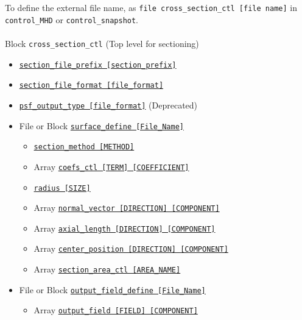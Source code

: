 To define the external file name, as \verb|file cross_section_ctl [file name]| in \verb|control_MHD| or \verb|control_snapshot|. \\
\\
%
Block \verb|cross_section_ctl| (Top level for sectioning)
\label{href_i:cross_section_ctl}
\begin{itemize}
	\item \hyperref[href_t:section_file_prefix]
			{\tt section\_file\_prefix    [section\_prefix]}
	\item \hyperref[href_t:section_file_format]
			{\tt section\_file\_format        [file\_format]}
    \item \hyperref[href_t:psf_output_type]
            {\tt psf\_output\_type        [file\_format]}         {\color{red}(Deprecated)}
	\item File or Block \hyperref[href_t:surface_define]{\tt surface\_define    [File\_Name]}
		\begin{itemize}
			\item \hyperref[href_t:section_method]
				{\tt section\_method    [METHOD]}
			\item Array \hyperref[href_t:psf_coefs_ctl]
				{\tt coefs\_ctl        [TERM]         [COEFFICIENT]}
			\item \hyperref[href_t:psf_radius]{\tt radius    [SIZE]}
			\item Array \hyperref[href_t:psf_normal_vector]
				{\tt normal\_vector    [DIRECTION]    [COMPONENT]}
			\item Array \hyperref[href_t:psf_axial_length]
                {\tt axial\_length     [DIRECTION]    [COMPONENT]}
			\item Array \hyperref[href_t:psf_center_position]
                {\tt center\_position  [DIRECTION]    [COMPONENT]}
%
			\item Array \hyperref[href_t:section_area_ctl]
				{\tt section\_area\_ctl        [AREA\_NAME]}
	\end{itemize}
%
	\item File or Block \hyperref[href_t:output_field_define]{\tt output\_field\_define    [File\_Name]}
		\begin{itemize}
			\item Array \hyperref[href_t:psf_output_field]
                {\tt output\_field     [FIELD]    [COMPONENT]}
		\end{itemize}
\end{itemize}

